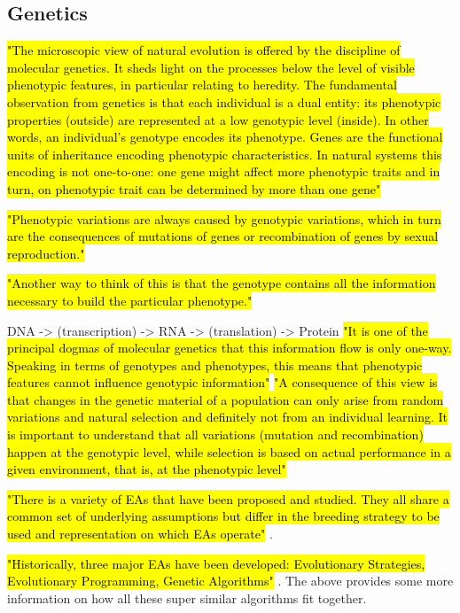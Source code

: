 \subsection{Genetics}

\hl{"The microscopic view of natural evolution is offered by the discipline of molecular genetics. It sheds light on the processes below the level of visible phenotypic features, in particular relating to heredity. The fundamental observation from genetics is that each individual is a dual entity: its phenotypic properties (outside) are represented at a low genotypic level (inside). In other words, an individual's genotype encodes its phenotype. Genes are the functional units of inheritance encoding phenotypic characteristics. In natural systems this encoding is not one-to-one: one gene might affect more phenotypic traits and in turn, on phenotypic trait can be determined by more than one gene"} \cite{EibenSmith2003}

\hl{"Phenotypic variations are always caused by genotypic variations, which in turn are the consequences of mutations of genes or recombination of genes by sexual reproduction."} \cite{EibenSmith2003}

\hl{"Another way to think of this is that the genotype contains all the information necessary to build the particular phenotype."} \cite{EibenSmith2003}

DNA -> (transcription) -> RNA -> (translation) -> Protein
\hl{"It is one of the principal dogmas of molecular genetics that this information flow is only one-way. Speaking in terms of genotypes and phenotypes, this means that phenotypic features cannot influence genotypic information"} \cite{EibenSmith2003}
\hl{"A consequence of this view is that changes in the genetic material of a population can only arise from random variations and natural selection and definitely not from an individual learning. It is important to understand that all variations (mutation and recombination) happen at the genotypic level, while selection is based on actual performance in a given environment, that is, at the phenotypic level"} \cite{EibenSmith2003}



\hl{"There is a variety of EAs that have been proposed and studied. They all share a common set of underlying assumptions but differ in the breeding strategy to be used and representation on which EAs operate"} \cite{kicinger2005evolutionary}.


\hl{"Historically, three major EAs have been developed: Evolutionary Strategies, Evolutionary Programming, Genetic Algorithms"} \cite{kicinger2005evolutionary}.
The above provides some more information on how all these super similar algorithms fit together.


